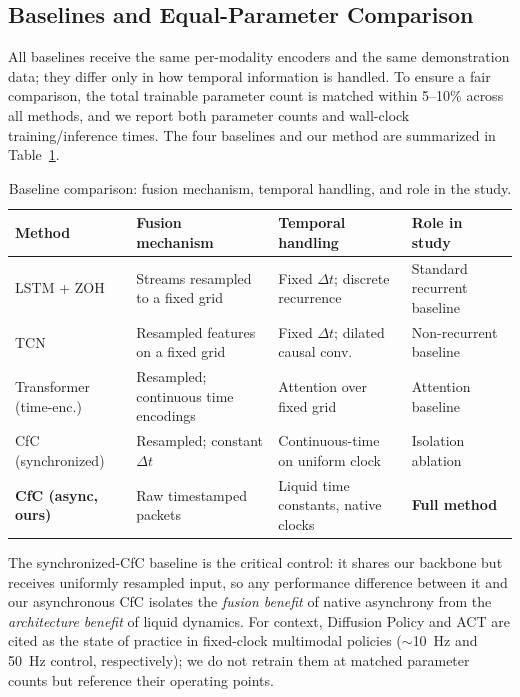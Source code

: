 \documentclass[conference]{IEEEtran}
\begin{document}
\subsection{Baselines and Equal-Parameter Comparison}
All baselines receive the same per-modality encoders and the same demonstration data; they differ only in how temporal information is handled. To ensure a fair comparison, the total trainable parameter count is matched within 5--10\% across all methods, and we report both parameter counts and wall-clock training/inference times. The four baselines and our method are summarized in Table~\ref{tab:baselines}.

\begin{table}[t]
\centering
\caption{Baseline comparison: fusion mechanism, temporal handling, and role in the study.}
\label{tab:baselines}
\begin{tabular}{@{}llll@{}}
\toprule
\textbf{Method} & \textbf{Fusion mechanism} & \textbf{Temporal handling} & \textbf{Role in study} \\
\midrule
LSTM + ZOH & Streams resampled to a fixed grid & Fixed $\Delta t$; discrete recurrence & Standard recurrent baseline \\
TCN & Resampled features on a fixed grid & Fixed $\Delta t$; dilated causal conv. & Non-recurrent baseline \\
Transformer (time-enc.) & Resampled; continuous time encodings & Attention over fixed grid & Attention baseline \\
CfC (synchronized) & Resampled; constant $\Delta t$ & Continuous-time on uniform clock & Isolation ablation \\
\textbf{CfC (async, ours)} & Raw timestamped packets & Liquid time constants, native clocks & \textbf{Full method} \\
\bottomrule
\end{tabular}
\end{table}

The synchronized-CfC baseline is the critical control: it shares our backbone but receives uniformly resampled input, so any performance difference between it and our asynchronous CfC isolates the \emph{fusion benefit} of native asynchrony from the \emph{architecture benefit} of liquid dynamics. For context, Diffusion Policy \cite{chi2023diffusion} and ACT \cite{zhao2023act} are cited as the state of practice in fixed-clock multimodal policies ($\sim$10~Hz and 50~Hz control, respectively); we do not retrain them at matched parameter counts but reference their operating points.
\end{document}
